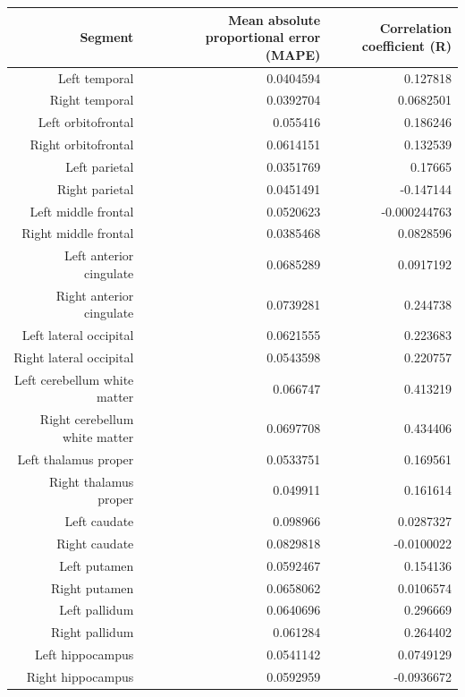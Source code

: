 \documentclass{article}
\begin{document}
  \begin{table}[h]
  
  \begin{centering}
    \tiny
    \begin{tabular}{|r|r|r|}
      \hline\hline
      \textbf{Segment} & \textbf{Mean absolute proportional error (MAPE)} & \textbf{Correlation coefficient (R)} \\\hline
      Left temporal & 0.0404594 & 0.127818 \\
      Right temporal & 0.0392704 & 0.0682501 \\
      Left orbitofrontal & 0.055416 & 0.186246 \\
      Right orbitofrontal & 0.0614151 & 0.132539 \\
      Left parietal & 0.0351769 & 0.17665 \\
      Right parietal & 0.0451491 & -0.147144 \\
      Left middle frontal & 0.0520623 & -0.000244763 \\
      Right middle frontal & 0.0385468 & 0.0828596 \\
      Left anterior cingulate & 0.0685289 & 0.0917192 \\
      Right anterior cingulate & 0.0739281 & 0.244738 \\
      Left lateral occipital & 0.0621555 & 0.223683 \\
      Right lateral occipital & 0.0543598 & 0.220757 \\
      Left cerebellum white matter & 0.066747 & 0.413219 \\
      Right cerebellum white matter & 0.0697708 & 0.434406 \\
      Left thalamus proper & 0.0533751 & 0.169561 \\
      Right thalamus proper & 0.049911 & 0.161614 \\
      Left caudate & 0.098966 & 0.0287327 \\
      Right caudate & 0.0829818 & -0.0100022 \\
      Left putamen & 0.0592467 & 0.154136 \\
      Right putamen & 0.0658062 & 0.0106574 \\
      Left pallidum & 0.0640696 & 0.296669 \\
      Right pallidum & 0.061284 & 0.264402 \\
      Left hippocampus & 0.0541142 & 0.0749129 \\
      Right hippocampus & 0.0592959 & -0.0936672 \\

\end{tabular}
\end{centering}
\end{table}
\end{document}
